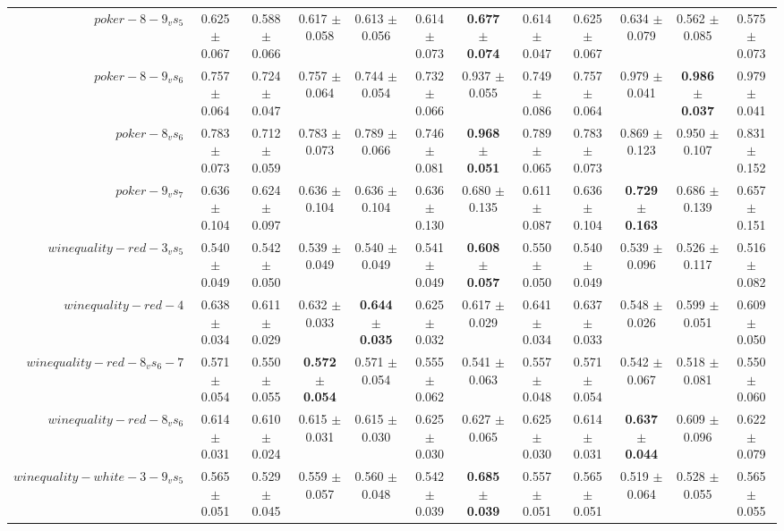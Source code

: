 \begin{table}[!ht]
{\begin{tabular}{r c c c c c c c c c c c}
$poker-8-9_vs_5$ & 0.625 $\pm$ 0.067 & 0.588 $\pm$ 0.066 & 0.617 $\pm$ 0.058 & 0.613 $\pm$ 0.056 & 0.614 $\pm$ 0.073 & \textbf{0.677 $\pm$ 0.074} & 0.614 $\pm$ 0.047 & 0.625 $\pm$ 0.067 & 0.634 $\pm$ 0.079 & 0.562 $\pm$ 0.085 & 0.575 $\pm$ 0.073 \\
$poker-8-9_vs_6$ & 0.757 $\pm$ 0.064 & 0.724 $\pm$ 0.047 & 0.757 $\pm$ 0.064 & 0.744 $\pm$ 0.054 & 0.732 $\pm$ 0.066 & 0.937 $\pm$ 0.055 & 0.749 $\pm$ 0.086 & 0.757 $\pm$ 0.064 & 0.979 $\pm$ 0.041 & \textbf{0.986 $\pm$ 0.037} & 0.979 $\pm$ 0.041 \\
$poker-8_vs_6$ & 0.783 $\pm$ 0.073 & 0.712 $\pm$ 0.059 & 0.783 $\pm$ 0.073 & 0.789 $\pm$ 0.066 & 0.746 $\pm$ 0.081 & \textbf{0.968 $\pm$ 0.051} & 0.789 $\pm$ 0.065 & 0.783 $\pm$ 0.073 & 0.869 $\pm$ 0.123 & 0.950 $\pm$ 0.107 & 0.831 $\pm$ 0.152 \\
$poker-9_vs_7$ & 0.636 $\pm$ 0.104 & 0.624 $\pm$ 0.097 & 0.636 $\pm$ 0.104 & 0.636 $\pm$ 0.104 & 0.636 $\pm$ 0.130 & 0.680 $\pm$ 0.135 & 0.611 $\pm$ 0.087 & 0.636 $\pm$ 0.104 & \textbf{0.729 $\pm$ 0.163} & 0.686 $\pm$ 0.139 & 0.657 $\pm$ 0.151 \\
$winequality-red-3_vs_5$ & 0.540 $\pm$ 0.049 & 0.542 $\pm$ 0.050 & 0.539 $\pm$ 0.049 & 0.540 $\pm$ 0.049 & 0.541 $\pm$ 0.049 & \textbf{0.608 $\pm$ 0.057} & 0.550 $\pm$ 0.050 & 0.540 $\pm$ 0.049 & 0.539 $\pm$ 0.096 & 0.526 $\pm$ 0.117 & 0.516 $\pm$ 0.082 \\
$winequality-red-4$ & 0.638 $\pm$ 0.034 & 0.611 $\pm$ 0.029 & 0.632 $\pm$ 0.033 & \textbf{0.644 $\pm$ 0.035} & 0.625 $\pm$ 0.032 & 0.617 $\pm$ 0.029 & 0.641 $\pm$ 0.034 & 0.637 $\pm$ 0.033 & 0.548 $\pm$ 0.026 & 0.599 $\pm$ 0.051 & 0.609 $\pm$ 0.050 \\
$winequality-red-8_vs_6-7$ & 0.571 $\pm$ 0.054 & 0.550 $\pm$ 0.055 & \textbf{0.572 $\pm$ 0.054} & 0.571 $\pm$ 0.054 & 0.555 $\pm$ 0.062 & 0.541 $\pm$ 0.063 & 0.557 $\pm$ 0.048 & 0.571 $\pm$ 0.054 & 0.542 $\pm$ 0.067 & 0.518 $\pm$ 0.081 & 0.550 $\pm$ 0.060 \\
$winequality-red-8_vs_6$ & 0.614 $\pm$ 0.031 & 0.610 $\pm$ 0.024 & 0.615 $\pm$ 0.031 & 0.615 $\pm$ 0.030 & 0.625 $\pm$ 0.030 & 0.627 $\pm$ 0.065 & 0.625 $\pm$ 0.030 & 0.614 $\pm$ 0.031 & \textbf{0.637 $\pm$ 0.044} & 0.609 $\pm$ 0.096 & 0.622 $\pm$ 0.079 \\
$winequality-white-3-9_vs_5$ & 0.565 $\pm$ 0.051 & 0.529 $\pm$ 0.045 & 0.559 $\pm$ 0.057 & 0.560 $\pm$ 0.048 & 0.542 $\pm$ 0.039 & \textbf{0.685 $\pm$ 0.039} & 0.557 $\pm$ 0.051 & 0.565 $\pm$ 0.051 & 0.519 $\pm$ 0.064 & 0.528 $\pm$ 0.055 & 0.565 $\pm$ 0.055 \\

\end{tabular}}
\end{table}
